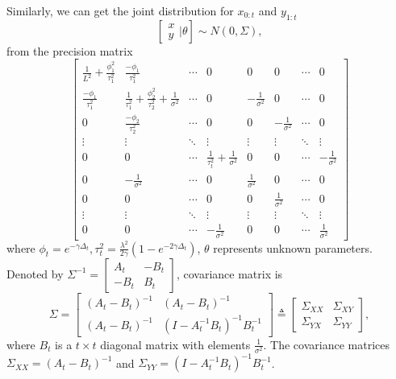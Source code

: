 Similarly, we can get the joint distribution for $x_{0:t}$ and $y_{1:t}$ 
\begin{equation*}
\left[ \begin{matrix} x\\y  \end{matrix}\bigg\rvert \theta \right]
\sim N\left(0, \Sigma  \right),
\end{equation*}
from the precision matrix 
\begin{equation*}
\begin{bmatrix}
\frac{1}{L^2}+\frac{\phi_1^2}{\tau_1^2} & \frac{-\phi_1}{\tau_1^2} & \cdots & 0 & 0 & 0& \cdots & 0\\ 
\frac{-\phi_1}{\tau_1^2}   &\frac{1}{\tau_1^2}+\frac{\phi_2^2}{\tau_2^2}+\frac{1}{\sigma^2}& \cdots & 0 & -\frac{1}{\sigma^2} &0 & \cdots & 0 \\
0 & \frac{-\phi_2}{\tau_2^2}   &  \cdots & 0 & 0& -\frac{1}{\sigma^2} & \cdots & 0\\
\vdots & \vdots & \ddots & \vdots & \vdots & \vdots & \ddots & \vdots \\
0 & 0   &  \cdots & \frac{1}{\tau_t^2}+\frac{1}{\sigma^2} & 0 & 0 & \cdots &-\frac{1}{\sigma^2}\\
0 & -\frac{1}{\sigma^2}  & \cdots & 0 & \frac{1}{\sigma^2} & 0 & \cdots & 0 \\
0& 0 & \cdots & 0 & 0 &  \frac{1}{\sigma^2} & \cdots & 0\\
\vdots & \vdots & \ddots & \vdots & \vdots & \vdots & \ddots & \vdots\\
0 & 0& \cdots &-\frac{1}{\sigma^2} & 0 & 0 & \cdots &  \frac{1}{\sigma^2}
\end{bmatrix}
\end{equation*}
where $\phi_t = e^{-\gamma\Delta_t}, \tau^2_t = \frac{\lambda^2}{2\gamma}\left(1-e^{-2\gamma\Delta_t}\right)$, $\theta$ represents unknown parameters. Denoted by $\Sigma^{-1}=\begin{bmatrix} A_t & -B_t \\ -B_t & B_t\end{bmatrix}$, covariance matrix is 
\begin{equation}
\Sigma=\begin{bmatrix} \left(A_t-B_t\right)^{-1} &  \left(A_t-B_t\right)^{-1} \\ \left(A_t-B_t\right)^{-1} & \left(I-A_t^{-1}B_t\right)^{-1}B_t^{-1} \end{bmatrix} \triangleq \begin{bmatrix}
\Sigma_{XX} & \Sigma_{XY}  \\ \Sigma_{YX} & \Sigma_{YY} 
\end{bmatrix},
\end{equation}
where $B_t$ is a $t\times t$ diagonal matrix with elements $\frac{1}{\sigma^2}$. The covariance matrices $\Sigma_{XX} =  \left(A_t-B_t\right)^{-1}$ and $\Sigma_{YY} =  \left(I-A_t^{-1}B_t\right)^{-1}B_t^{-1}$. 



